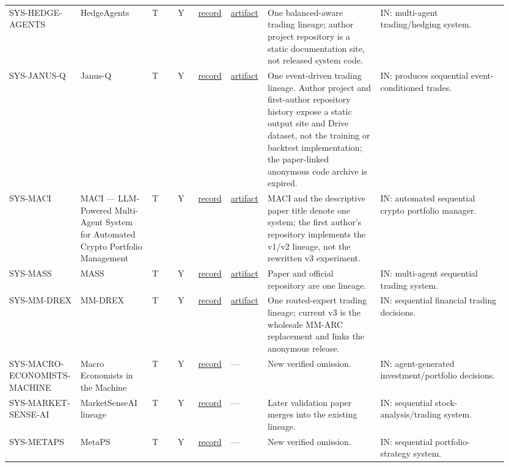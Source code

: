 \begin{longtable}{@{}L{0.12\linewidth}L{0.14\linewidth}L{0.05\linewidth}L{0.04\linewidth}L{0.06\linewidth}L{0.07\linewidth}L{0.22\linewidth}L{0.25\linewidth}@{}}
SYS-\allowbreak{}HEDGE-\allowbreak{}AGENTS & HedgeAgents & T & Y & \href{https://arxiv.org/abs/2502.13165}{record} & \href{https://github.com/hedgeagents/hedgeagents.github.io}{artifact} & One balanced-aware trading lineage; author project repository is a static documentation site, not released system code. & IN: multi-agent trading/hedging system. \\
SYS-\allowbreak{}JANUS-\allowbreak{}Q & Janus-Q & T & Y & \href{https://arxiv.org/abs/2602.19919}{record} & \href{https://cute-twilight-5f2400.netlify.app}{artifact} & One event-driven trading lineage. Author project and first-author repository history expose a static output site and Drive dataset, not the training or backtest implementation; the paper-linked anonymous code archive is expired. & IN: produces sequential event-conditioned trades. \\
SYS-\allowbreak{}MACI & MACI — LLM-Powered Multi-Agent System for Automated Crypto Portfolio Management & T & Y & \href{https://arxiv.org/abs/2501.00826}{record} & \href{https://github.com/lyc0603/multi-agent}{artifact} & MACI and the descriptive paper title denote one system; the first author's repository implements the v1/v2 lineage, not the rewritten v3 experiment. & IN: automated sequential crypto portfolio manager. \\
SYS-\allowbreak{}MASS & MASS & T & Y & \href{https://arxiv.org/abs/2505.10278}{record} & \href{https://github.com/gta0804/MASS}{artifact} & Paper and official repository are one lineage. & IN: multi-agent sequential trading system. \\
SYS-\allowbreak{}MM-\allowbreak{}DREX & MM-DREX & T & Y & \href{https://arxiv.org/abs/2509.05080}{record} & \href{https://anonymous.4open.science/r/MM-ARC-32F7/}{artifact} & One routed-expert trading lineage; current v3 is the wholesale MM-ARC replacement and links the anonymous release. & IN: sequential financial trading decisions. \\
SYS-\allowbreak{}MACRO-\allowbreak{}ECONOMISTS-\allowbreak{}MACHINE & Macro Economists in the Machine & T & Y & \href{https://arxiv.org/abs/2606.08283}{record} & --- & New verified omission. & IN: agent-generated investment/portfolio decisions. \\
SYS-\allowbreak{}MARKET-\allowbreak{}SENSE-\allowbreak{}AI & MarketSenseAI lineage & T & Y & \href{https://arxiv.org/abs/2502.00415}{record} & --- & Later validation paper merges into the existing lineage. & IN: sequential stock-analysis/trading system. \\
SYS-\allowbreak{}METAPS & MetaPS & T & Y & \href{https://arxiv.org/abs/2606.22385}{record} & --- & New verified omission. & IN: sequential portfolio-strategy system. \\

\end{longtable}
